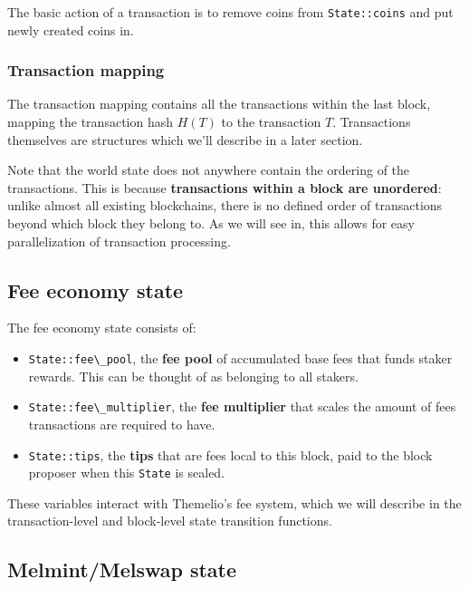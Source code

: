 \documentclass[
]{article}
\newcommand{\passthrough}[1]{#1}
\providecommand{\tightlist}{%
  \setlength{\itemsep}{0pt}\setlength{\parskip}{0pt}}
\begin{document}
The basic action of a transaction is to remove coins from
\passthrough{\lstinline!State::coins!} and put newly created coins in.

\hypertarget{transaction-mapping}{%
  \subsubsection{Transaction mapping}\label{transaction-mapping}}

The transaction mapping contains all the transactions within the last
block, mapping the transaction hash \(H(T)\) to the transaction \(T\).
Transactions themselves are structures which we'll describe in a later
section.

Note that the world state does not anywhere contain the ordering of the
transactions. This is because \textbf{transactions within a block are
  unordered}: unlike almost all existing blockchains, there is no defined
order of transactions beyond which block they belong to. As we will see
in, this allows for easy parallelization of transaction processing.

\hypertarget{fee-economy-state}{%
  \subsection{Fee economy state}\label{fee-economy-state}}

The fee economy state consists of:

\begin{itemize}
  \tightlist
  \item
        \passthrough{\lstinline!State::fee\_pool!}, the \textbf{fee pool} of
        accumulated base fees that funds staker rewards. This can be thought
        of as belonging to all stakers.
  \item
        \passthrough{\lstinline!State::fee\_multiplier!}, the \textbf{fee
          multiplier} that scales the amount of fees transactions are required
        to have.
  \item
        \passthrough{\lstinline!State::tips!}, the \textbf{tips} that are fees
        local to this block, paid to the block proposer when this
        \passthrough{\lstinline!State!} is sealed.
\end{itemize}

These variables interact with Themelio's fee system, which we will
describe in the transaction-level and block-level state transition
functions.

\hypertarget{melmintmelswap-state}{%
  \subsection{Melmint/Melswap state}\label{melmintmelswap-state}}
\end{document}
